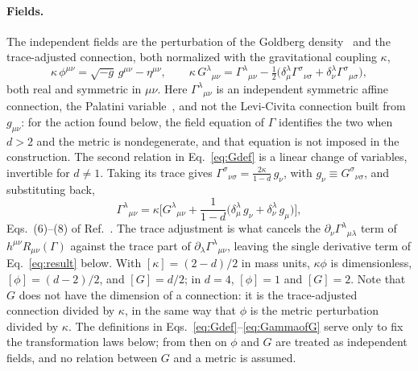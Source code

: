 \documentclass[prd,aps,preprint,superscriptaddress,nofootinbib,amsmath,amssymb,eqsecnum]{revtex4-2}
\begin{document}
\paragraph{Fields.} The independent fields are the perturbation of the Goldberg
density~\cite{Goldberg1958} and
the trace-adjusted connection, both normalized with the gravitational coupling $\kappa$,
\begin{equation}
\kappa\,\phi^{\mu\nu}=\sqrt{-g}\,g^{\mu\nu}-\eta^{\mu\nu},\qquad
\kappa\,G^{\lambda}{}_{\mu\nu}=\Gamma^{\lambda}{}_{\mu\nu}
-\tfrac12\big(\delta^{\lambda}_{\mu}\Gamma^{\sigma}{}_{\nu\sigma}
+\delta^{\lambda}_{\nu}\Gamma^{\sigma}{}_{\mu\sigma}\big),
\label{eq:Gdef}
\end{equation}
both real and symmetric in $\mu\nu$. Here $\Gamma^{\lambda}{}_{\mu\nu}$ is an independent
symmetric affine connection, the Palatini variable~\cite{Palatini1919,Ferraris1982}, and not
the Levi-Civita connection built
from $g_{\mu\nu}$: for the action found below, the field equation of $\Gamma$ identifies the
two when $d>2$ and the metric is nondegenerate, and that equation is not imposed in the
construction. The second relation in Eq.~\eqref{eq:Gdef} is a linear change of variables,
invertible for $d\neq1$. Taking its trace
gives $\Gamma^{\sigma}{}_{\nu\sigma}=\frac{2\kappa}{1-d}\,g_\nu$, with
$g_\nu\equiv G^{\sigma}{}_{\nu\sigma}$, and substituting back,
\begin{equation}
\Gamma^{\lambda}{}_{\mu\nu}=\kappa\Big[G^{\lambda}{}_{\mu\nu}
+\frac{1}{1-d}\big(\delta^{\lambda}_{\mu}\,g_\nu+\delta^{\lambda}_{\nu}\,g_\mu\big)\Big],
\label{eq:GammaofG}
\end{equation}
Eqs.~(6)--(8) of Ref.~\cite{BrandtMcKeon2015}. The trace adjustment is what cancels the
$\partial_\nu\Gamma^{\lambda}{}_{\mu\lambda}$ term of $h^{\mu\nu}R_{\mu\nu}(\Gamma)$ against
the trace part of $\partial_\lambda\Gamma^{\lambda}{}_{\mu\nu}$, leaving the single derivative
term of Eq.~\eqref{eq:result} below. With
$[\kappa]=(2-d)/2$ in mass units, $\kappa\phi$ is dimensionless, $[\phi]=(d-2)/2$, and
$[G]=d/2$; in $d=4$, $[\phi]=1$ and $[G]=2$. Note that $G$ does not have the dimension of a
connection: it is the trace-adjusted connection divided by $\kappa$, in the same way that
$\phi$ is the metric perturbation divided by $\kappa$. The definitions in
Eqs.~\eqref{eq:Gdef}--\eqref{eq:GammaofG} serve only to fix the transformation laws below;
from then on $\phi$ and $G$ are treated as independent fields, and no relation between $G$ and
a metric is assumed.
\end{document}
